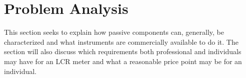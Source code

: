 \chapter{Problem Analysis} \label{ch:ProblemAnalysis}
This section seeks to explain how passive components can, generally, be characterized and what instruments are commercially available to do it. The section will also discuss which requirements both professional and individuals may have for an LCR meter and what a reasonable price point may be for an individual.
